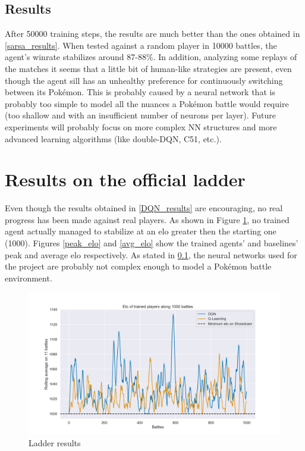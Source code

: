 \documentclass{article}
\begin{document}
\subsection{Results} \label{NN_complexity}

After 50000 training steps, the results are much better than the ones obtained in \ref{sarsa_results}.
When tested against a random player in 10000 battles, the agent's winrate stabilizes around 87-88\%.
In addition, analyzing some replays of the matches it seems that a little bit of human-like strategies are present, even though the agent sill has an unhealthy preference for continuously switching between its Pokémon.
This is probably caused by a neural network that is probably too simple to model all the nuances a Pokémon battle would require (too shallow and with an insufficient number of neurons per layer).
Future experiments will probably focus on more complex NN structures and more advanced learning algorithms (like double-DQN, C51, etc.).


\section{Results on the official ladder}

Even though the results obtained in \ref{DQN_results} are encouraging, no real progress has been made against real players.
As shown in Figure \ref{ladder_results}, no trained agent actually managed to stabilize at an elo greater then the starting one (1000).
Figures \ref{peak_elo} and \ref{avg_elo} show the trained agents' and baselines' peak and average elo respectively.
As stated in \ref{NN_complexity}, the neural networks used for the project are probably not complex enough to model a Pokémon battle environment.

\begin{figure}
    \centering
    \includegraphics[width=\textwidth]{img/rank.png}
    \caption{Ladder results}
    \label{ladder_results}
\end{figure}
\end{document}
